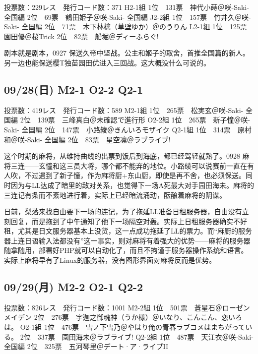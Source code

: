     投票数：229レス　発行コード数：371
    H2-1組
    1位　131票　神代小蒔＠咲-Saki- 全国編
    2位　69票　鶴田姫子＠咲-Saki- 全国編
    J2-2組
    1位　157票　竹井久＠咲-Saki- 全国編
    2位　71票　木下林檎（草壁ゆか）＠のうりん
    L2-1組
    1位　125票　園田優＠桜Trick
    2位　82票　船堀＠ディーふらぐ!

剧本就是剧本，0927 保送久帝中坚战。公主和姬子的取舍，首推全国篇的新人。另一边也能保送樱T独苗园田优进入三回战。这大概没什么可说的。

\subsection{09/28(日) M2-1 O2-2 Q2-1}

    投票数：419レス　発行コード数：589
    M2-1組
    1位　265票　松実玄＠咲-Saki- 全国編
    2位　139票　三峰真白＠未確認で進行形
    O2-2組
    1位　265票　新子憧＠咲-Saki- 全国編
    2位　147票　小路綾＠きんいろモザイク
    Q2-1組
    1位　314票　原村和＠咲-Saki- 全国編
    2位　83票　星空凛＠ラブライブ!

这个时期的麻将，从维持曲线的出票到饭后到海底，都已经驾轻就熟了。0928 麻将三连——玄憧和这三员大将，哪个都不能弃的地位。小路绫可以说赛前一直在有人吹，不过遇到了新子憧，作为麻将厨+东山厨，即使是再不舍，也必须保送。同时因为与LL达成了暗里的敌对关系，也觉得下一场A死最大对手园田海未。麻将的三连记有条而不紊地进行着，实际上已经暗流涌动，酝酿着麻将的阴谋。

日前，梨落来找自由要下一场的连记，为了拖延LL准备日租服务器，自由没有立刻回复，而是拖到了中午通知了他下一场隔空对轰。实际上日租服务器确实不好租，尤其是日文服务器基本上没货，这一点成功拖延了LL的票力。而“麻厨的服务器上连日语输入法都没有”这一事实，则对麻将有着强大的优势——麻将的服务器随拿随用，部署好PHP就可以自动化了，而且不拘谨于服务器操作系统和语言。实际上麻将早有了Linux的服务器，没有图形界面对麻将反而是优势。

\subsection{09/29(月) M2-2 O2-1 Q2-2}

    投票数：826レス　発行コード数：1001
    M2-2組
    1位　501票　蒼星石＠ローゼンメイデン
    2位　276票　宇迦之御魂神（うか様）＠いなり、こんこん、恋いろは。
    O2-1組
    1位　476票　雪ノ下雪乃＠やはり俺の青春ラブコメはまちがっている。
    2位　337票　園田海未＠ラブライブ!
    Q2-2組
    1位　487票　天江衣＠咲-Saki- 全国編
    2位　325票　五河琴里＠デート·ア·ライブII

